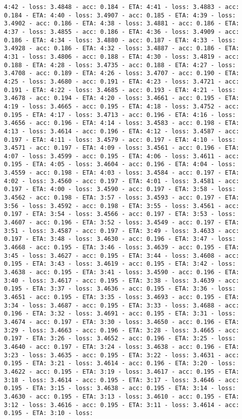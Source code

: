 \documentclass[11pt]{article}
\begin{document}
\begin{Verbatim}[commandchars=\\\{\}]
4:42 - loss: 3.4848 - acc: 0.184 - ETA: 4:41 - loss: 3.4883 - acc: 0.184 - ETA: 4:40 - loss: 3.4907 - acc: 0.185 - ETA: 4:39 - loss: 3.4902 - acc: 0.186 - ETA: 4:38 - loss: 3.4881 - acc: 0.186 - ETA: 4:37 - loss: 3.4855 - acc: 0.186 - ETA: 4:36 - loss: 3.4909 - acc: 0.186 - ETA: 4:34 - loss: 3.4880 - acc: 0.187 - ETA: 4:33 - loss: 3.4928 - acc: 0.186 - ETA: 4:32 - loss: 3.4887 - acc: 0.186 - ETA: 4:31 - loss: 3.4806 - acc: 0.188 - ETA: 4:30 - loss: 3.4819 - acc: 0.188 - ETA: 4:28 - loss: 3.4735 - acc: 0.188 - ETA: 4:27 - loss: 3.4708 - acc: 0.189 - ETA: 4:26 - loss: 3.4707 - acc: 0.190 - ETA: 4:25 - loss: 3.4680 - acc: 0.191 - ETA: 4:23 - loss: 3.4721 - acc: 0.191 - ETA: 4:22 - loss: 3.4685 - acc: 0.193 - ETA: 4:21 - loss: 3.4678 - acc: 0.194 - ETA: 4:20 - loss: 3.4661 - acc: 0.195 - ETA: 4:19 - loss: 3.4665 - acc: 0.195 - ETA: 4:18 - loss: 3.4752 - acc: 0.195 - ETA: 4:17 - loss: 3.4713 - acc: 0.196 - ETA: 4:16 - loss: 3.4656 - acc: 0.196 - ETA: 4:14 - loss: 3.4583 - acc: 0.198 - ETA: 4:13 - loss: 3.4614 - acc: 0.196 - ETA: 4:12 - loss: 3.4587 - acc: 0.197 - ETA: 4:11 - loss: 3.4579 - acc: 0.197 - ETA: 4:10 - loss: 3.4571 - acc: 0.197 - ETA: 4:09 - loss: 3.4561 - acc: 0.196 - ETA: 4:07 - loss: 3.4599 - acc: 0.195 - ETA: 4:06 - loss: 3.4611 - acc: 0.195 - ETA: 4:05 - loss: 3.4604 - acc: 0.196 - ETA: 4:04 - loss: 3.4559 - acc: 0.198 - ETA: 4:03 - loss: 3.4584 - acc: 0.197 - ETA: 4:02 - loss: 3.4560 - acc: 0.197 - ETA: 4:01 - loss: 3.4581 - acc: 0.197 - ETA: 4:00 - loss: 3.4590 - acc: 0.197 - ETA: 3:58 - loss: 3.4562 - acc: 0.198 - ETA: 3:57 - loss: 3.4593 - acc: 0.197 - ETA: 3:56 - loss: 3.4592 - acc: 0.198 - ETA: 3:55 - loss: 3.4561 - acc: 0.197 - ETA: 3:54 - loss: 3.4566 - acc: 0.197 - ETA: 3:53 - loss: 3.4607 - acc: 0.196 - ETA: 3:52 - loss: 3.4549 - acc: 0.197 - ETA: 3:51 - loss: 3.4587 - acc: 0.197 - ETA: 3:49 - loss: 3.4633 - acc: 0.197 - ETA: 3:48 - loss: 3.4630 - acc: 0.196 - ETA: 3:47 - loss: 3.4668 - acc: 0.195 - ETA: 3:46 - loss: 3.4639 - acc: 0.195 - ETA: 3:45 - loss: 3.4627 - acc: 0.195 - ETA: 3:44 - loss: 3.4608 - acc: 0.195 - ETA: 3:43 - loss: 3.4619 - acc: 0.195 - ETA: 3:42 - loss: 3.4638 - acc: 0.195 - ETA: 3:41 - loss: 3.4590 - acc: 0.196 - ETA: 3:40 - loss: 3.4617 - acc: 0.195 - ETA: 3:38 - loss: 3.4639 - acc: 0.195 - ETA: 3:37 - loss: 3.4636 - acc: 0.195 - ETA: 3:36 - loss: 3.4651 - acc: 0.195 - ETA: 3:35 - loss: 3.4693 - acc: 0.195 - ETA: 3:34 - loss: 3.4687 - acc: 0.195 - ETA: 3:33 - loss: 3.4688 - acc: 0.196 - ETA: 3:32 - loss: 3.4691 - acc: 0.195 - ETA: 3:31 - loss: 3.4674 - acc: 0.197 - ETA: 3:30 - loss: 3.4650 - acc: 0.196 - ETA: 3:29 - loss: 3.4663 - acc: 0.196 - ETA: 3:28 - loss: 3.4665 - acc: 0.197 - ETA: 3:26 - loss: 3.4652 - acc: 0.196 - ETA: 3:25 - loss: 3.4640 - acc: 0.197 - ETA: 3:24 - loss: 3.4638 - acc: 0.196 - ETA: 3:23 - loss: 3.4635 - acc: 0.195 - ETA: 3:22 - loss: 3.4631 - acc: 0.195 - ETA: 3:21 - loss: 3.4614 - acc: 0.196 - ETA: 3:20 - loss: 3.4622 - acc: 0.195 - ETA: 3:19 - loss: 3.4617 - acc: 0.195 - ETA: 3:18 - loss: 3.4614 - acc: 0.195 - ETA: 3:17 - loss: 3.4646 - acc: 0.195 - ETA: 3:15 - loss: 3.4638 - acc: 0.195 - ETA: 3:14 - loss: 3.4630 - acc: 0.195 - ETA: 3:13 - loss: 3.4610 - acc: 0.195 - ETA: 3:12 - loss: 3.4616 - acc: 0.195 - ETA: 3:11 - loss: 3.4614 - acc: 0.195 - ETA: 3:10 - loss: 
\end{Verbatim}
\end{document}
